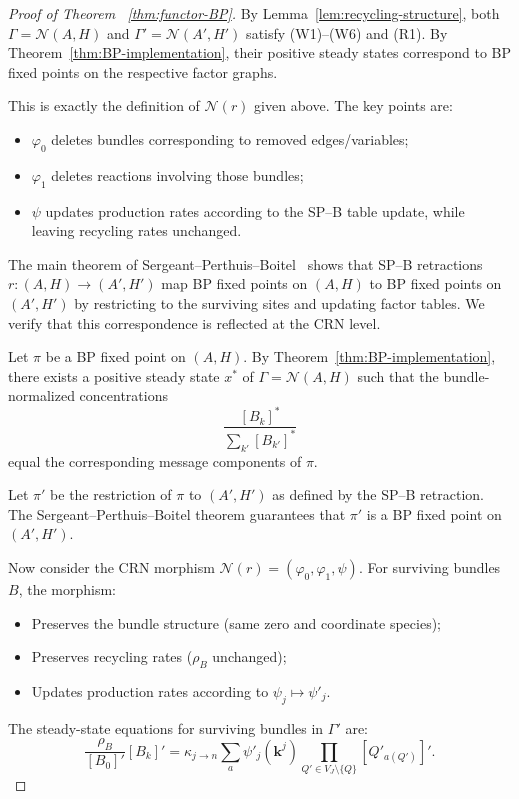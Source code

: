 \documentclass{article}
\theoremstyle{plain}
\theoremstyle{definition}
\theoremstyle{remark}
\newcommand{\<}{\langle}
\renewcommand{\>}{\rangle}
\begin{document}
\begin{proof}[Proof of Theorem ~\ref{thm:functor-BP}]
By Lemma~\ref{lem:recycling-structure}, both $\Gamma = \mathcal{N}(A, H)$ 
and $\Gamma' = \mathcal{N}(A', H')$ satisfy (W1)--(W6) and (R1). By Theorem~\ref{thm:BP-implementation}, 
their positive steady states correspond to BP fixed points on the respective factor graphs.

This is exactly the definition of $\mathcal{N}(r)$ given above. The 
key points are:
\begin{itemize}
\item $\varphi_0$ deletes bundles corresponding to removed edges/variables;
\item $\varphi_1$ deletes reactions involving those bundles;
\item $\psi$ updates production rates according to the SP--B table update, while 
leaving recycling rates unchanged.
\end{itemize}

The main theorem of Sergeant--Perthuis--Boitel~\cite{sergeantperthuis2025minimacriticalpointsbethe} 
shows that SP--B retractions $r : (A, H) \to (A', H')$ map BP fixed points on $(A, H)$ 
to BP fixed points on $(A', H')$ by restricting to the surviving sites and updating 
factor tables. We verify that this correspondence is reflected at the CRN level.

Let $\pi$ be a BP fixed point on $(A, H)$. By Theorem~\ref{thm:BP-implementation}, 
there exists a positive steady state $x^*$ of $\Gamma = \mathcal{N}(A, H)$ such that 
the bundle-normalized concentrations
\[
\frac{[B_k]^*}{\sum_{k'} [B_{k'}]^*}
\]
equal the corresponding message components of $\pi$.

Let $\pi'$ be the restriction of $\pi$ to $(A', H')$ as defined by the SP--B retraction. 
The Sergeant--Perthuis--Boitel theorem guarantees that $\pi'$ is a BP fixed point on 
$(A', H')$.

Now consider the CRN morphism $\mathcal{N}(r) = (\varphi_0, \varphi_1, \psi)$. For 
surviving bundles $B$, the morphism:
\begin{itemize}
\item Preserves the bundle structure (same zero and coordinate species);
\item Preserves recycling rates ($\rho_B$ unchanged);
\item Updates production rates according to $\psi_j \mapsto \psi'_j$.
\end{itemize}

The steady-state equations for surviving bundles in $\Gamma'$ are:
\[
\frac{\rho_B}{[B_0]'}[B_k]' = \kappa_{j \to n} \sum_a \psi'_j(\mathbf{k}^j) \prod_{Q' \in V_J\setminus\{Q\}} [Q'_{a(Q')}]'.
\]


\end{proof}
\end{document}
